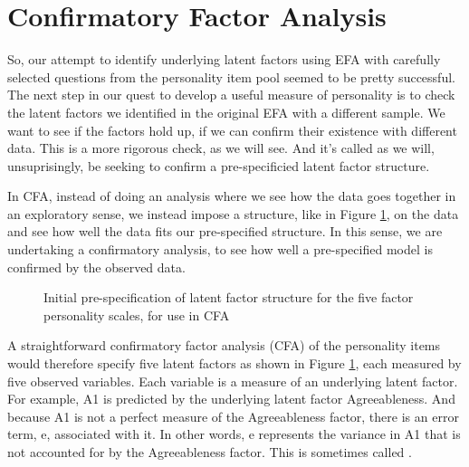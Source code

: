 \section{Confirmatory Factor Analysis~\label{sec:CFA}}

So, our attempt to identify underlying latent factors using EFA with carefully selected questions from the personality item pool seemed to be pretty successful.  The next step in our quest to develop a useful measure of personality is to check the latent factors we identified in the original EFA with a different sample. We want to see if the factors hold up, if we can confirm their existence with different data. This is a more rigorous check, as we will see. And it's called  as we will, unsuprisingly, be seeking to confirm a pre-specificied latent factor structure.

In CFA, instead of doing an analysis where we see how the data goes together in an exploratory sense, we instead impose a structure, like in Figure \ref{fig:cfa1}, on the data and see how well the data fits our pre-specified structure. In this sense, we are undertaking a confirmatory analysis, to see how well a pre-specified model is confirmed by the observed data.

\begin{figure}[!htp]
\begin{center}
\caption{Initial pre-specification of latent factor structure for the five factor personality scales, for use in CFA}
\label{fig:cfa1}
\HR
\end{center}
\end{figure}

A straightforward confirmatory factor analysis (CFA) of the personality items would therefore specify five latent factors as shown in Figure \ref{fig:cfa1}, each measured by five observed variables. Each variable is a measure of an underlying latent factor. For example, A1 is predicted by the underlying latent factor Agreeableness. And because A1 is not a perfect measure of the Agreeableness factor, there is an error term, e, associated with it. In other words, e represents the variance in A1 that is not accounted for by the Agreeableness factor. This is sometimes called .

